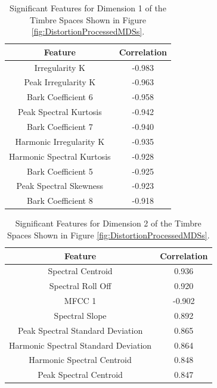 		\begin{table}[h!]
			\centering
			\begin{tabular}{|c|c|}
				\hline
				\bf{Feature} & \bf{Correlation} \\
				\hline
				\hline
				Irregularity K & -0.983 \\
				\hline
				Peak Irregularity K & -0.963 \\
				\hline
				Bark Coefficient 6 & -0.958 \\
				\hline
				Peak Spectral Kurtosis & -0.942 \\
				\hline
				Bark Coefficient 7 & -0.940 \\
				\hline
				Harmonic Irregularity K & -0.935 \\
				\hline
				Harmonic Spectral Kurtosis & -0.928 \\
				\hline
				Bark Coefficient 5 & -0.925 \\
				\hline
				Peak Spectral Skewness & -0.923 \\
				\hline
				Bark Coefficient 8 & -0.918 \\
				\hline
			\end{tabular}
			\caption{Significant Features for Dimension 1 of the Timbre Spaces Shown in Figure 
				 \ref{fig:DistortionProcessedMDSs}.}
			\label{tab:DistortionProcessedFeaturesDim1}
		\end{table}

		\begin{table}[h!]
			\centering
			\begin{tabular}{|c|c|}
				\hline
				\bf{Feature} & \bf{Correlation} \\
				\hline
				\hline
				Spectral Centroid &  0.936 \\
				\hline
				Spectral Roll Off &  0.920 \\
				\hline
				MFCC 1 & -0.902 \\
				\hline
				Spectral Slope &  0.892 \\
				\hline
				Peak Spectral Standard Deviation &  0.865 \\
				\hline
				Harmonic Spectral Standard Deviation &  0.864 \\
				\hline
				Harmonic Spectral Centroid &  0.848 \\
				\hline
				Peak Spectral Centroid &  0.847 \\
				\hline
			\end{tabular}
			\caption{Significant Features for Dimension 2 of the Timbre Spaces Shown in Figure 
				 \ref{fig:DistortionProcessedMDSs}.}
			\label{tab:DistortionProcessedFeaturesDim2}
		\end{table}

